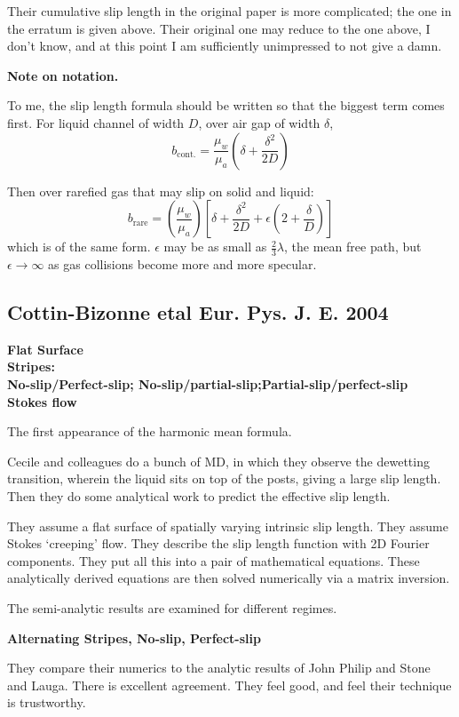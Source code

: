 \documentclass{article}
\begin{document}
Their cumulative slip length in the original paper is more complicated; the one in the erratum is given above.  Their original one may reduce to the one above, I don't know, and at this point I am sufficiently unimpressed to not give a damn.


\textbf{Note on notation.}

To me, the slip length formula should be written so that the  biggest term comes first.  For liquid channel of width $D$, over air gap of width $\delta$,
\[ b_{\mathrm{cont.}} = \frac{\mu_{w}}{\mu_{a}} 
\left( \delta + \frac{\delta^{2}}{2D}  \right) \]

Then over rarefied gas that may slip on solid and liquid:
\[ b_{\mathrm{rare}} = \left( \frac{\mu_{w}}{\mu_{a}} \right)
\left[ \delta + \frac{\delta^{2}}{2D} + \epsilon \left( 2 + \frac{\delta}{D} \right)  \right] \]
which is of the same form. $\epsilon$ may be as small as $\frac{2}{3}\lambda$, the mean free path, but $\epsilon \rightarrow \infty$ as gas collisions become more and more specular.


\subsection*{Cottin-Bizonne etal Eur. Pys. J. E. 2004}

\textbf{Flat Surface\\Stripes:\\
 No-slip/Perfect-slip; No-slip/partial-slip;Partial-slip/perfect-slip\\ Stokes flow}

The first appearance of the harmonic mean formula.

Cecile and colleagues do a bunch of MD, in which they observe the dewetting transition, wherein the liquid sits on top of the posts, giving a large slip length.
Then they do some analytical work to predict the effective slip length.

They assume a flat surface of spatially varying intrinsic slip length.  They assume Stokes `creeping' flow. They describe the slip length function with 2D Fourier components.  They put all this into a pair of mathematical equations.  These analytically derived equations are then solved numerically via a matrix inversion.

The semi-analytic results are examined for different regimes.

\textbf{Alternating Stripes, No-slip, Perfect-slip}

They compare their numerics to the analytic results of John Philip and Stone and Lauga.  There is excellent agreement.  They feel good, and feel their technique is trustworthy.
\end{document}

